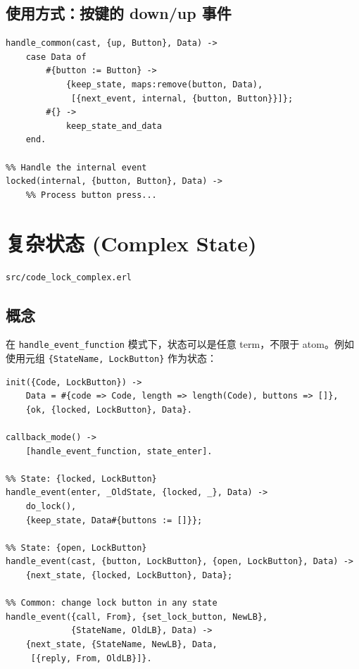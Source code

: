 \documentclass[a4paper,11pt]{article}
\begin{document}
\subsection{使用方式：按键的 down/up 事件}

\begin{lstlisting}[style=erlangstyle]
%% Convert up event to internal button event
handle_common(cast, {up, Button}, Data) ->
    case Data of
        #{button := Button} ->
            {keep_state, maps:remove(button, Data),
             [{next_event, internal, {button, Button}}]};
        #{} ->
            keep_state_and_data
    end.

%% Handle the internal event
locked(internal, {button, Button}, Data) ->
    %% Process button press...
\end{lstlisting}


\section{复杂状态 (Complex State)}

\begin{notebox}[源码文件]
\texttt{src/code\_lock\_complex.erl}
\end{notebox}

\subsection{概念}

在 \texttt{handle\_event\_function} 模式下，状态可以是任意 term，不限于 atom。例如使用元组 \texttt{\{StateName, LockButton\}} 作为状态：

\begin{lstlisting}[style=erlangstyle]
init({Code, LockButton}) ->
    Data = #{code => Code, length => length(Code), buttons => []},
    {ok, {locked, LockButton}, Data}.

callback_mode() ->
    [handle_event_function, state_enter].

%% State: {locked, LockButton}
handle_event(enter, _OldState, {locked, _}, Data) ->
    do_lock(),
    {keep_state, Data#{buttons := []}};

%% State: {open, LockButton}
handle_event(cast, {button, LockButton}, {open, LockButton}, Data) ->
    {next_state, {locked, LockButton}, Data};

%% Common: change lock button in any state
handle_event({call, From}, {set_lock_button, NewLB},
             {StateName, OldLB}, Data) ->
    {next_state, {StateName, NewLB}, Data,
     [{reply, From, OldLB}]}.
\end{lstlisting}
\end{document}

